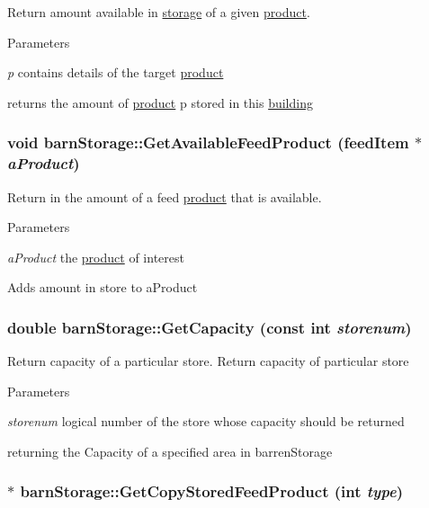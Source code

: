 Return amount available in \hyperlink{classstorage}{storage} of a given \hyperlink{classproduct}{product}. 
\begin{DoxyParams}{Parameters}
\item[{\em p}]contains details of the target \hyperlink{classproduct}{product}\end{DoxyParams}
returns the amount of \hyperlink{classproduct}{product} p stored in this \hyperlink{classbuilding}{building} \hypertarget{classbarn_storage_a679ed8112c05c5bdbda203a65dcf6cf8}{
\subsubsection[{GetAvailableFeedProduct}]{\setlength{\rightskip}{0pt plus 5cm}void barnStorage::GetAvailableFeedProduct ({\bf feedItem} $\ast$ {\em aProduct})}}
\label{classbarn_storage_a679ed8112c05c5bdbda203a65dcf6cf8}


Return in the amount of a feed \hyperlink{classproduct}{product} that is available. 
\begin{DoxyParams}{Parameters}
\item[{\em aProduct}]the \hyperlink{classproduct}{product} of interest\end{DoxyParams}
Adds amount in store to aProduct \hypertarget{classbarn_storage_a7e11082a34b3ffdaad4426e926355e4a}{
\subsubsection[{GetCapacity}]{\setlength{\rightskip}{0pt plus 5cm}double barnStorage::GetCapacity (const int {\em storenum})}}
\label{classbarn_storage_a7e11082a34b3ffdaad4426e926355e4a}


Return capacity of a particular store. Return capacity of particular store 
\begin{DoxyParams}{Parameters}
\item[{\em storenum}]logical number of the store whose capacity should be returned\end{DoxyParams}
returning the Capacity of a specified area in barrenStorage \hypertarget{classbarn_storage_a181a94edd100406b138a55c77aa15c79}{
\subsubsection[{GetCopyStoredFeedProduct}]{ $\ast$ barnStorage::GetCopyStoredFeedProduct (int {\em type})}}
\label{classbarn_storage_a181a94edd100406b138a55c77aa15c79}



